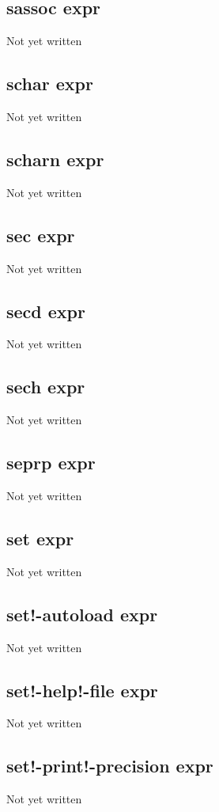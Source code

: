 \documentclass[a4paper,11pt]{article}
\begin{document}
{\subsection{\ttfamily sassoc expr}
   Not yet written

\subsection{\ttfamily schar expr}
   Not yet written

\subsection{\ttfamily scharn expr}
   Not yet written

\subsection{\ttfamily sec expr}
   Not yet written

\subsection{\ttfamily secd expr}
   Not yet written

\subsection{\ttfamily sech expr}
   Not yet written

\subsection{\ttfamily seprp expr}
   Not yet written

\subsection{\ttfamily set expr}
   Not yet written

\subsection{\ttfamily set!-autoload expr}
   Not yet written

\subsection{\ttfamily set!-help!-file expr}
   Not yet written

\subsection{\ttfamily set!-print!-precision expr}
   Not yet written

}
\end{document}
